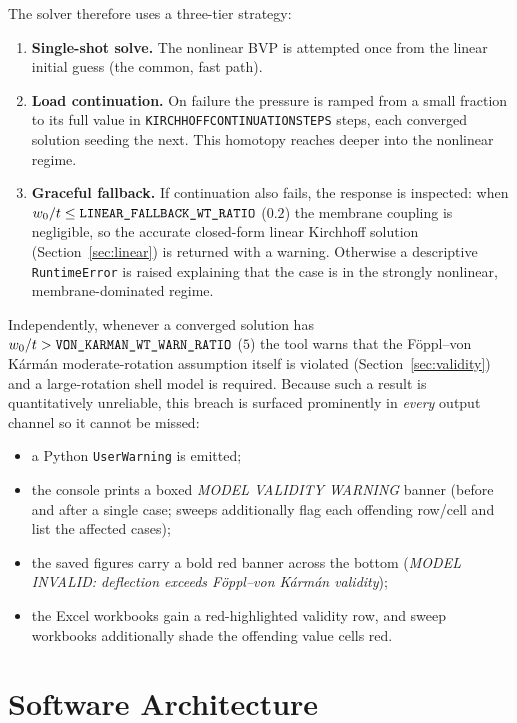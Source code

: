 \documentclass[11pt]{article}
\newcommand{\codeus}{\textunderscore\allowbreak}
\DeclareRobustCommand{\code}[1]{\texttt{\ifmmode\else\renewcommand{\_}{\codeus}\fi#1}}
\begin{document}
The solver therefore uses a three-tier strategy:
%
\begin{enumerate}
  \item \textbf{Single-shot solve.} The nonlinear BVP is attempted once from the
    linear initial guess (the common, fast path).
  \item \textbf{Load continuation.} On failure the pressure is ramped from a
    small fraction to its full value in \code{KIRCHHOFF\_CONTINUATION\_STEPS}
    steps, each converged solution seeding the next. This homotopy reaches
    deeper into the nonlinear regime.
  \item \textbf{Graceful fallback.} If continuation also fails, the response is
    inspected: when $w_0/t \le \code{LINEAR\_FALLBACK\_WT\_RATIO}$ ($0.2$) the
    membrane coupling is negligible, so the accurate closed-form linear
    Kirchhoff solution (Section~\ref{sec:linear}) is returned with a warning.
    Otherwise a descriptive \code{RuntimeError} is raised explaining that the
    case is in the strongly nonlinear, membrane-dominated regime.
\end{enumerate}
%
Independently, whenever a converged solution has $w_0/t >
\code{VON\_KARMAN\_WT\_WARN\_RATIO}$ ($5$) the tool warns that the
F\"oppl--von K\'arm\'an moderate-rotation assumption itself is violated
(Section~\ref{sec:validity}) and a large-rotation shell model is required.
Because such a result is quantitatively unreliable, this breach is surfaced
prominently in \emph{every} output channel so it cannot be missed:
%
\begin{itemize}
  \item a Python \code{UserWarning} is emitted;
  \item the console prints a boxed \emph{MODEL VALIDITY WARNING} banner (before
    and after a single case; sweeps additionally flag each offending row/cell
    and list the affected cases);
  \item the saved figures carry a bold red banner across the bottom
    (\emph{MODEL INVALID: deflection exceeds F\"oppl--von K\'arm\'an validity});
  \item the Excel workbooks gain a red-highlighted validity row, and sweep
    workbooks additionally shade the offending value cells red.
\end{itemize}

\section{Software Architecture}
\end{document}

